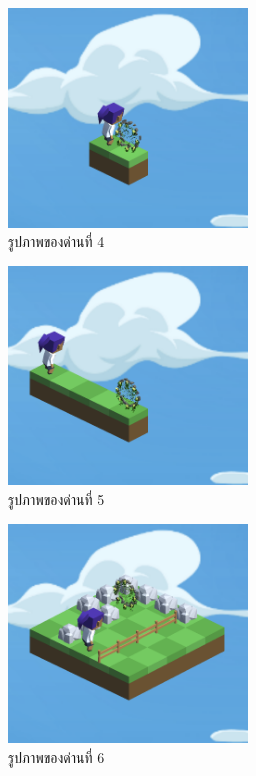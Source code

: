 \begin{figure}[H]
    \begin{center}
    \includegraphics[width=2.5in]{pic-toro/stage/s4.png}
    \end{center}
    \caption[รูปภาพของด่านที่ 4]{รูปภาพของด่านที่ 4}
    \label{s4}
\end{figure}
\begin{figure}[H]
    \begin{center}
    \includegraphics[width=2.5in]{pic-toro/stage/s5.png}
    \end{center}
    \caption[รูปภาพของด่านที่ 5]{รูปภาพของด่านที่ 5}
    \label{s5}
\end{figure}
\begin{figure}[H]
    \begin{center}
    \includegraphics[width=2.5in]{pic-toro/stage/s6.png}
    \end{center}
    \caption[รูปภาพของด่านที่ 6]{รูปภาพของด่านที่ 6}
    \label{s6}
\end{figure}
